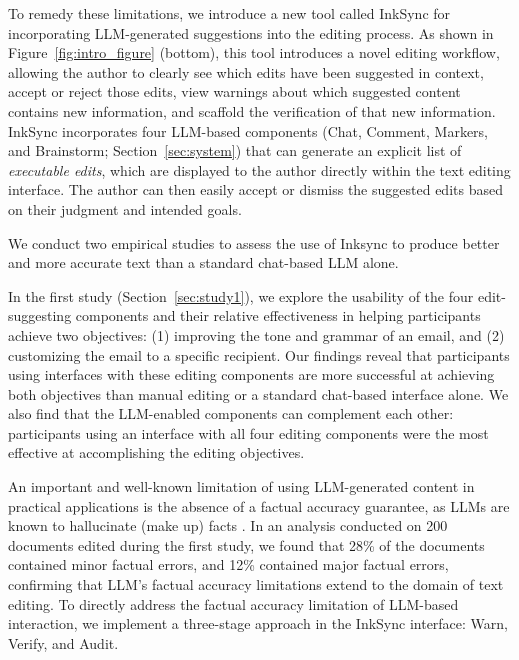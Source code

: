 \documentclass[manuscript]{acmart}
\begin{document}
To remedy these limitations, we introduce a new tool called InkSync for incorporating LLM-generated suggestions into the editing process. As shown in Figure~\ref{fig:intro_figure} (bottom), this tool introduces a novel editing workflow, allowing the author to clearly see which edits have been suggested in context, accept or reject those edits, view warnings about which suggested content contains new information, and scaffold the verification of that new information. %
InkSync incorporates four LLM-based components (Chat, Comment, Markers, and Brainstorm; Section~\ref{sec:system}) that can generate an explicit list of \textit{executable edits}, which are displayed to the author directly within the text editing interface. The author can then easily accept or dismiss the suggested edits based on their judgment and intended goals.

We conduct two empirical studies to assess the use of Inksync to produce better and more accurate text than a standard chat-based LLM alone.
 
In the first study (Section~\ref{sec:study1}), we explore the usability of the four edit-suggesting components and their relative effectiveness in helping participants achieve two objectives: (1) improving the tone and grammar of an email, and (2) customizing the email to a specific recipient.
Our findings reveal that participants using interfaces with these editing components are more successful at achieving both objectives than manual editing or a standard chat-based interface alone. We also find that the LLM-enabled components can complement each other: participants using an interface with all four editing components were the most effective at accomplishing the editing objectives.

An important and well-known limitation of using LLM-generated content in practical applications is the absence of a factual accuracy guarantee, as LLMs are known to hallucinate (make up) facts \cite{bang2023multitask,kryscinski2019neural}.
In an analysis conducted on 200 documents edited during the first study, we found that 28\% of the documents contained minor factual errors, and 12\% contained major factual errors, confirming that LLM's factual accuracy limitations extend to the domain of text editing.
To directly address the factual accuracy limitation of LLM-based interaction, we implement a three-stage approach in the InkSync interface: Warn, Verify, and Audit. 
\end{document}
